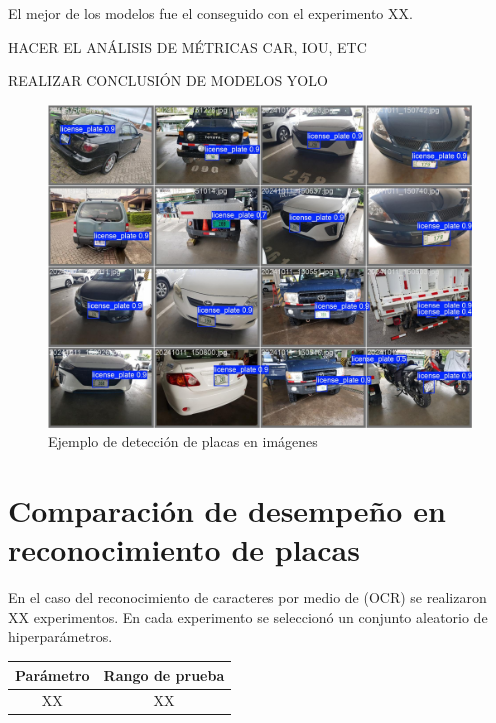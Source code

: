 El mejor de los modelos fue el conseguido con el experimento XX. 

HACER EL ANÁLISIS DE MÉTRICAS CAR, IOU, ETC

REALIZAR CONCLUSIÓN DE MODELOS YOLO

\begin{figure}[H]
	\includegraphics[width=\textwidth]{fig/proy/ejemplo-deteccion-placas.jpg}
	\caption{Ejemplo de detección de placas en imágenes}
	\label{fig:ejemplo-deteccion-placa}
\end{figure}

\section{Comparación de desempeño en reconocimiento de placas}

En el caso del reconocimiento de caracteres por medio de (OCR) se realizaron
XX experimentos. En cada experimento se seleccionó un conjunto aleatorio de
hiperparámetros.

\begin{table}[H]
	\begin{tabular}{| c | c |}
		\hline
		Parámetro & Rango de prueba \\	
		\hline
		XX & XX \\
		\hline
	\end{tabular}
\end{table}

